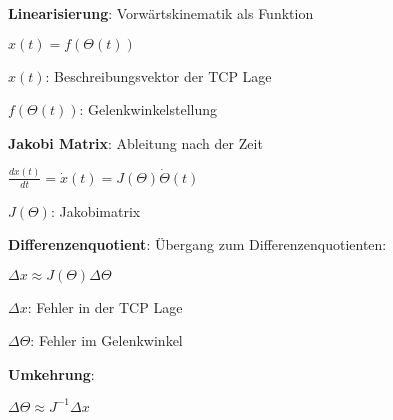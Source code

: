  \begin{compactenum}
     \item \textbf{Linearisierung}: Vorwärtskinematik als Funktion
     \begin{compactitem}
         \item $x(t) = f(\Theta(t))$
         \begin{compactitem}
             \item $x(t)$: Beschreibungsvektor der TCP Lage
             \item $f(\Theta(t))$: Gelenkwinkelstellung
         \end{compactitem}
     \end{compactitem}
     \item \textbf{Jakobi Matrix}: Ableitung nach der Zeit
     \begin{compactitem}
         \item $\frac{dx(t)}{dt} = \dot{x}(t) = J(\Theta)\dot{\Theta}(t)$
         \begin{compactitem}
             \item $J(\Theta)$: Jakobimatrix
         \end{compactitem}
     \end{compactitem}
     \item \textbf{Differenzenquotient}: Übergang zum Differenzenquotienten:
     \begin{compactitem}
         \item $\Delta x \approx J(\Theta)\Delta\Theta$
         \begin{compactitem}
             \item $\Delta x$: Fehler in der TCP Lage
             \item $\Delta\Theta$: Fehler im Gelenkwinkel
         \end{compactitem}

     \end{compactitem}
     \item \textbf{Umkehrung}:
     \begin{compactitem}
         \item $\Delta\Theta \approx J^{-1}\Delta x$
     \end{compactitem}
 \end{compactenum}
